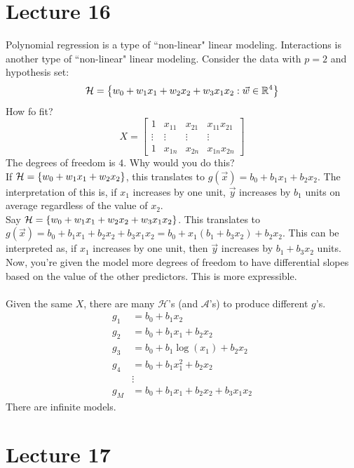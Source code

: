 \documentclass[12pt]{article}
\begin{document}
\section{Lecture 16} 
Polynomial regression is a type of ``non-linear" linear modeling. Interactions is another type of ``non-linear" linear modeling. Consider the data with $p=2$ and hypothesis set: $$\mathcal{H} = \left\{ w_0 + w_1x_1 + w_2x_2 + w_3x_1x_2: \vec{w} \in \mathbb{R}^4 \right\} $$ 
How fo fit? 
$$X = \begin{bmatrix} 1 & x_{11} & x_{21} & x_{11}x_{21} \\ \vdots & \vdots & \vdots & \vdots \\ 1 & x_{1n} & x_{2n} & x_{1n}x_{2n} \end{bmatrix} $$ 
The degrees of freedom is $4$. Why would you do this? \\
If $\mathcal{H} = \left\{ w_0 + w_1x_1 + w_2x_2 \right\}$, this translates to $g(\vec{x}) = b_0 + b_1x_1 + b_2x_2$. The interpretation of this is, if $x_1$ increases by one unit, $\vec{y}$ increases by $b_1$ units on average regardless of the value of $x_2$. \\
Say $\mathcal{H} = \left\{ w_0 + w_1x_1 + w_2x_2 + w_3x_1x_2 \right\}$. This translates to $g(\vec{x}) = b_0 + b_1x_1 + b_2x_2 + b_3x_1x_2 = b_0 + x_1(b_1 + b_3x_2) + b_2x_2$. This can be interpreted as, if $x_1$ increases by one unit, then $\vec{y}$ increases by $b_1 + b_3x_2$ units. \\
Now, you're given the model more degrees of freedom to have differential slopes based on the value of the other predictors. This is more expressible. \\~\\
Given the same $X$, there are many $\mathcal{H}$'s (and $\mathcal{A}$'s) to produce different $g$'s. $$ \begin{aligned} 
g_1 &= b_0 + b_1x_2 \\ g_2 &= b_0 + b_1x_1 + b_2x_2 \\ g_3 &= b_0 + b_1\log(x_1) + b_2x_2 \\ g_4 &= b_0 + b_1x_1^2 + b_2x_2 \\ &\vdots \\ g_M &= b_0 + b_1x_1 + b_2x_2 + b_3x_1x_2 \end{aligned} $$ 
There are infinite models. 
\section{Lecture 17} 
\end{document}
